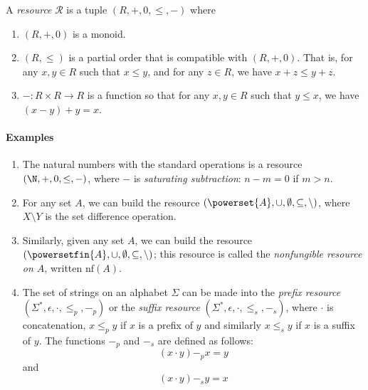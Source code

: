 \documentclass[10pt]{article}
\begin{document}
\begin{definition}
    A \emph{resource} $\mathcal{R}$ is a tuple $(R, +, 0, \leq, -)$ where
    \begin{enumerate}[label=(\roman*)]
        \item $(R, +, 0)$ is a monoid.
        \item $(R, \leq)$ is a partial order that is compatible with $(R, +, 0)$.
            That is, for any $x, y \in R$ such that $x \leq y$, and for any $z \in R$, we have $x + z \leq y + z$.
        \item $- : R \times R \to R$ is a function so that for any $x,y \in R$ such that $y \leq x$, we have $(x - y) + y = x$.

    \end{enumerate}
\end{definition}

\paragraph{Examples}

\begin{enumerate}
    \item The natural numbers with the standard operations is a resource $(\N, +, 0, \leq, -)$, where $-$ is \emph{saturating subtraction}: $n - m = 0$ if $m > n$.
    \item For any set $A$, we can build the resource $(\powerset{A}, \cup, \emptyset, \subseteq, \setminus)$, where $X \setminus Y$ is the set difference operation.
    \item Similarly, given any set $A$, we can build the resource $(\powersetfin{A}, \cup, \emptyset, \subseteq, \setminus)$; this resource is called the \emph{nonfungible resource on $A$}, written $\text{nf}(A)$.
    \item {}
        The set of strings on an alphabet $\Sigma$ can be made into the \emph{prefix resource} $(\Sigma^*, \epsilon, \cdot, \leq_p, -_p)$ or the \emph{suffix resource} $(\Sigma^*, \epsilon, \cdot, \leq_s, -_s)$, where $\cdot$ is concatenation, $x \leq_p y$ if $x$ is a prefix of $y$ and similarly $x \leq_s y$ if $x$ is a suffix of $y$.
        The functions $-_p$ and $-_s$ are defined as follows:
        \[
            (x \cdot y) -_p x = y
        \]
        and
        \[
            (x \cdot y) -_s y = x
        \]
\end{enumerate}
\end{document}
